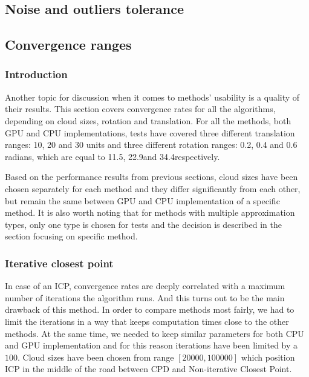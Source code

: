 \documentclass[titlepage]{article}
\begin{document}
\subsection{Noise and outliers tolerance}

\subsection{Convergence ranges}

\subsubsection{Introduction}
Another topic for discussion when it comes to methods' usability is a quality of their results. This section covers convergence rates for all the algorithms, depending on cloud sizes, rotation and translation. For all the methods, both GPU and CPU implementations, tests have covered three different translation ranges: 10, 20 and 30 units and three different rotation ranges: 0.2, 0.4 and 0.6 radians, which are equal to 11.5\degree, 22.9\degree and 34.4\degree respectively.

Based on the performance results from previous sections, cloud sizes have been chosen separately for each method and they differ significantly from each other, but remain the same between GPU and CPU implementation of a specific method. It is also worth noting that for methods with multiple approximation types, only one type is chosen for tests and the decision is described in the section focusing on specific method.

\subsubsection{Iterative closest point}
In case of an ICP, convergence rates are deeply correlated with a maximum number of iterations the algorithm runs. And this turns out to be the main drawback of this method. In order to compare methods most fairly, we had to limit the iterations in a way that keeps computation times close to the other methods. At the same time, we needed to keep similar parameters for both CPU and GPU implementation and for this reason iterations have been limited by a $100$. Cloud sizes have been chosen from range $[20000,100000]$ which position ICP in the middle of the road between CPD and Non-iterative Closest Point.
\end{document}
